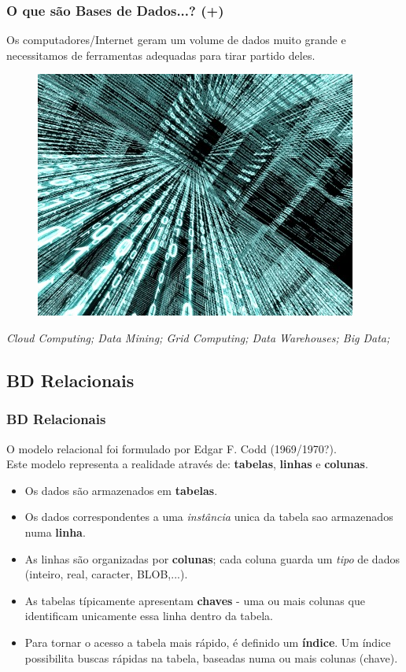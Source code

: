 \documentclass[hyperref={pdfpagelabels=true}]{beamer}
\begin{document}
\begin{frame}
\frametitle{O que s\~{a}o Bases de Dados...? (+)}
\begin{overprint}
Os computadores/Internet geram um volume de dados muito grande e necessitamos de ferramentas adequadas para tirar partido deles.\\
\begin{figure}
\includegraphics[scale=0.4]{Big-Data-on-cloud.jpg}
\end{figure}
\end{overprint}
\textit{Cloud Computing; Data Mining; Grid Computing; Data Warehouses; Big Data;}
\end{frame}

\subsection{BD Relacionais}
\begin{frame}
\frametitle{BD Relacionais}
O modelo relacional foi formulado por Edgar F. Codd (1969/1970?).\\
Este modelo representa a realidade atrav\'{e}s de: \textbf{tabelas}, \textbf{linhas} e \textbf{colunas}.
  \begin{itemize}
  \item<2-> Os dados s\~{a}o armazenados em \textbf{tabelas}.
  \item<3-> Os dados correspondentes a uma \textit{inst\^{a}ncia} unica da tabela sao armazenados numa \textbf{linha}.
  \item<4-> As linhas s\~{a}o organizadas por \textbf{colunas}; cada coluna guarda um \emph{tipo} de dados (inteiro, real, caracter, BLOB,...).    
  \item<5-> As tabelas t\'{i}picamente apresentam \textbf{chaves} - uma ou mais colunas que identificam unicamente essa linha dentro da tabela.
  \item<6-> Para tornar o acesso a tabela mais r\'{a}pido, \'{e} definido um \textbf{\'{i}ndice}. Um \'{i}ndice possibilita buscas r\'{a}pidas na tabela, baseadas numa ou mais colunas (chave).
  \end{itemize}
\end{frame}
\end{document}
